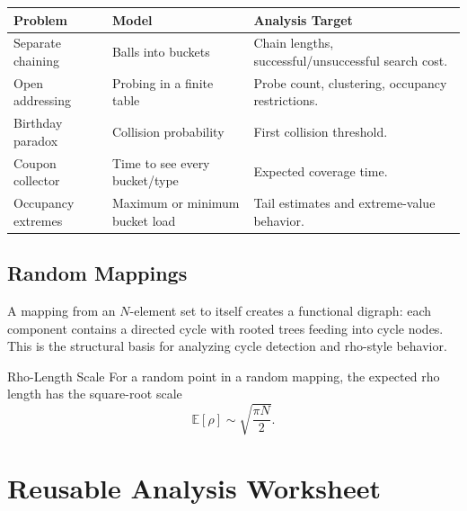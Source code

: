 \documentclass[11pt]{article}
\newcommand{\E}{\mathbb{E}}
\begin{document}
\begin{center}
\begin{tabularx}{\textwidth}{L{0.23\textwidth} L{0.30\textwidth} Y}
\toprule
\textbf{Problem} & \textbf{Model} & \textbf{Analysis Target} \\
\midrule
Separate chaining & Balls into buckets & Chain lengths, successful/unsuccessful search cost. \\
Open addressing & Probing in a finite table & Probe count, clustering, occupancy restrictions. \\
Birthday paradox & Collision probability & First collision threshold. \\
Coupon collector & Time to see every bucket/type & Expected coverage time. \\
Occupancy extremes & Maximum or minimum bucket load & Tail estimates and extreme-value behavior. \\
\bottomrule
\end{tabularx}
\end{center}

\subsection{Random Mappings}

A mapping from an \(N\)-element set to itself creates a functional digraph: each component contains a directed cycle with rooted trees feeding into cycle nodes. This is the structural basis for analyzing cycle detection and rho-style behavior.

\begin{mathbox}{Rho-Length Scale}
For a random point in a random mapping, the expected rho length has the square-root scale
\[
\E[\rho] \sim \sqrt{\frac{\pi N}{2}}.
\]
\end{mathbox}

\section{Reusable Analysis Worksheet}
\end{document}
